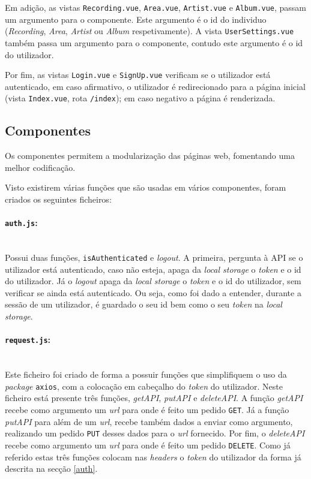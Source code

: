 \documentclass{article}
\begin{document}
Em adição, as vistas \texttt{Recording.vue}, \texttt{Area.vue}, \texttt{Artist.vue} e \texttt{Album.vue}, passam um argumento para o componente. Este argumento é o id do individuo (\textit{Recording}, \textit{Area}, \textit{Artist} ou \textit{Album} respetivamente). A vista \texttt{UserSettings.vue} também passa um argumento para o componente, contudo este argumento é o id do utilizador.

Por fim, as vistas \texttt{Login.vue} e \texttt{SignUp.vue} verificam se o utilizador está autenticado, em caso afirmativo, o utilizador é redirecionado para a página inicial (vista \texttt{Index.vue}, rota \texttt{/index}); em caso negativo a página é renderizada.

\subsection{Componentes}

Os componentes permitem a modularização das páginas web, fomentando uma melhor codificação.

Visto existirem várias funções que são usadas em vários componentes, foram criados os seguintes ficheiros:

\paragraph{\texttt{auth.js}:}\mbox{}\\

Possui duas funções, \texttt{isAuthenticated} e \textit{logout}. A primeira, pergunta à API se o utilizador está autenticado, caso não esteja, apaga da \textit{local storage} o \textit{token} e o id do utilizador. Já o \textit{logout} apaga da \textit{local storage} o \textit{token} e o id do utilizador, sem verificar se ainda está autenticado. Ou seja, como foi dado a entender, durante a sessão de um utilizador, é guardado o seu id bem como o seu \textit{token} na \textit{local storage}.

\paragraph{\texttt{request.js}:}\mbox{}\\

Este ficheiro foi criado de forma a possuir funções que simplifiquem o uso da \textit{package} \texttt{axios}, com a colocação em cabeçalho do \textit{token} do utilizador. Neste ficheiro está presente três funções, \textit{getAPI}, \textit{putAPI} e \textit{deleteAPI}. A função \textit{getAPI} recebe como argumento um \textit{url} para onde é feito um pedido \texttt{GET}. Já a função \textit{putAPI} para além de um \textit{url}, recebe também dados a enviar como argumento, realizando um pedido \texttt{PUT} desses dados para o \textit{url} fornecido. Por fim, o \textit{deleteAPI} recebe como argumento um \textit{url} para onde é feito um pedido \texttt{DELETE}. Como já referido estas três funções colocam nas \textit{headers} o \textit{token} do utilizador da forma já descrita na secção \ref{auth}.
\end{document}
